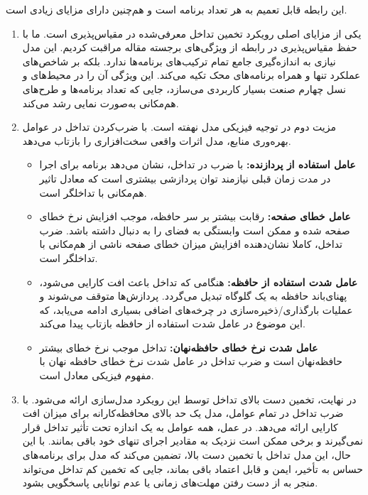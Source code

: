 این رابطه قابل تعمیم به هر تعداد برنامه است و هم‌چنین دارای مزایای زیادی است. 

\begin{enumerate}
\item
یکی از مزایای اصلی رویکرد تخمین تداخل معرفی‌شده در \cite{medel2023modeling} مقیاس‌پذیری است. ما با حفظ مقیاس‌پذیری در رابطه از ویژگی‌های برجسته مقاله مراقبت کردیم. این مدل نیازی به اندازه‌گیری جامع تمام ترکیب‌های برنامه‌ها ندارد. بلکه بر شاخص‌های عملکرد تنها و همراه برنامه‌های محک تکیه می‌کند. این ویژگی آن را در محیط‌های  و نسل چهارم صنعت بسیار کاربردی می‌سازد، جایی که تعداد برنامه‌ها و طرح‌های هم‌مکانی به‌صورت نمایی رشد می‌کند.
\item
مزیت دوم در توجیه فیزیکی مدل نهفته است. با ضرب‌کردن تداخل در عوامل بهره‌وری منابع، مدل اثرات واقعی سخت‌افزاری را بازتاب می‌دهد.

\begin{itemize}
\item
\textbf{عامل استفاده از پردازنده:} با ضرب در تداخل، نشان می‌دهد برنامه برای اجرا در مدت زمان قبلی نیازمند توان پردازشی بیشتری است که معادل تاثیر هم‌مکانی با تداخلگر است.
\item
\textbf{عامل خطای صفحه:} رقابت بیشتر بر سر حافظه، موجب افزایش نرخ خطای صفحه شده و ممکن است وابستگی به فضای  را به دنبال داشته باشد. ضرب تداخل، کاملا نشان‌دهنده افزایش میزان خطای صفحه ناشی از هم‌مکانی با تداخلگر است.
\item
\textbf{عامل شدت استفاده از حافظه:} هنگامی که تداخل باعث افت کارایی می‌شود، پهنای‌باند حافظه به یک گلوگاه تبدیل می‌گردد. پردازش‌ها متوقف می‌شوند و عملیات بارگذاری/ذخیره‌سازی در چرخه‌های اضافی بسیاری ادامه می‌یابد، که این موضوع در عامل شدت استفاده از حافظه بازتاب پیدا می‌کند.
\item
\textbf{عامل شدت نرخ خطای حافظه‌نهان:} تداخل موجب نرخ خطای بیشتر حافظه‌نهان است و ضرب تداخل در عامل شدت نرخ خطای حافظه نهان با مفهوم فیزیکی معادل است.
\end{itemize}

\item
در نهایت، تخمین دست بالای تداخل توسط این رویکرد مدل‌سازی ارائه می‌شود. با ضرب تداخل در تمام عوامل، مدل یک حد بالای محافظه‌کارانه برای میزان افت کارایی ارائه می‌دهد. در عمل، همه عوامل به یک اندازه تحت تأثیر تداخل قرار نمی‌گیرند و برخی ممکن است نزدیک به مقادیر اجرای تنهای خود باقی بمانند. با این حال، این مدل تداخل با تخمین دست بالا، تضمین می‌کند که مدل برای برنامه‌های حساس به تأخیر، ایمن و قابل اعتماد باقی بماند، جایی که تخمین کم تداخل می‌تواند منجر به از دست رفتن مهلت‌های زمانی یا عدم توانایی پاسخگویی بشود.
\end{enumerate}

